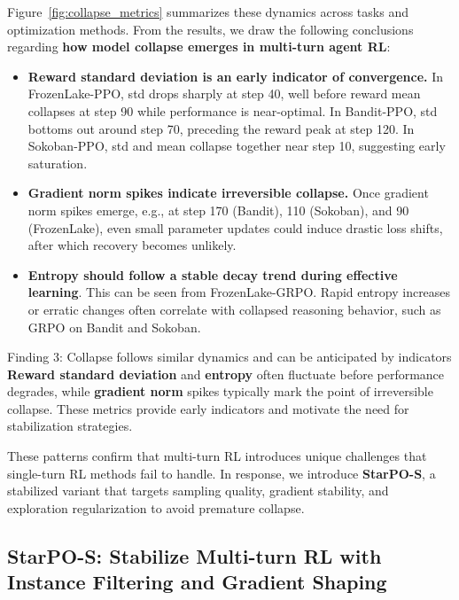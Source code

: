 Figure~\ref{fig:collapse_metrics} summarizes these dynamics across tasks and optimization methods. From the results, we draw the following conclusions regarding \textbf{how model collapse emerges in multi-turn agent RL}:
\vspace{-5pt}
\begin{itemize}[left=2pt, itemsep=2pt, topsep=4pt]
    \item \textbf{Reward standard deviation is an early indicator of convergence.} In FrozenLake-PPO, std drops sharply at step 40, well before reward mean collapses at step 90 while performance is near-optimal. In Bandit-PPO, std bottoms out around step 70, preceding the reward peak at step 120. In Sokoban-PPO, std and mean collapse together near step 10, suggesting early saturation. 

    
    \item \textbf{Gradient norm spikes indicate irreversible collapse.} Once gradient norm spikes emerge, e.g., at step 170 (Bandit), 110 (Sokoban), and 90 (FrozenLake), even small parameter updates could induce drastic loss shifts, after which recovery becomes unlikely.
    
    \item  \textbf{Entropy should follow a stable decay trend during effective learning}. This can be seen from FrozenLake-GRPO. Rapid entropy increases or erratic changes often correlate with collapsed reasoning behavior, such as GRPO on Bandit and Sokoban.
\end{itemize}
\vspace{-9pt}

\begin{onebox}{Finding 3: Collapse follows similar dynamics and can be anticipated by indicators}
\textbf{Reward standard deviation} and \textbf{entropy} often fluctuate before performance degrades, while \textbf{gradient norm} spikes typically mark the point of irreversible collapse. These metrics provide early indicators and motivate the need for stabilization strategies.
\end{onebox}
These patterns confirm that multi-turn RL introduces unique challenges that single-turn RL methods fail to handle. In response, we introduce \textbf{StarPO-S}, a stabilized variant that targets sampling quality, gradient stability, and exploration regularization to avoid premature collapse.




\subsection{StarPO-S: Stabilize Multi-turn RL with Instance Filtering and Gradient Shaping}

